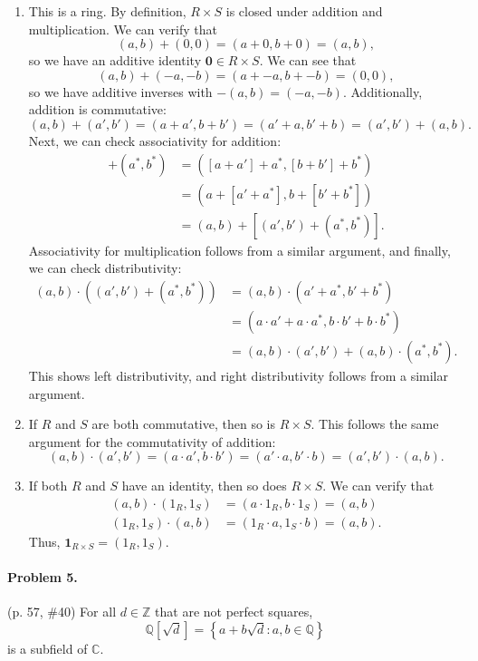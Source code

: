 \documentclass[12pt]{article}
\begin{document}
\begin{enumerate}
    \item[a.] This is a ring. By definition, $R\times S$ is closed under addition and multiplication. We can verify that \[(a, b) + (0, 0) = (a + 0, b + 0) = (a, b),\] so we have an additive identity $\mathbf 0 \in R \times S$. We can see that \[(a, b) + (-a, -b) = (a + -a, b + -b) = (0, 0),\] so we have additive inverses with $-(a, b) = (-a, -b)$. Additionally, addition is commutative: \[(a, b) + (a', b') = (a + a', b+ b') = (a' + a, b' + b) = (a', b') + (a, b).\]
    Next, we can check associativity for addition:
    \begin{align*}
        [(a,b) + (a',b')] + (a^\ast, b^\ast) &= ([a + a'] + a^\ast, [b + b'] + b^\ast) \\
        &= (a + [a' + a^\ast], b + [b' + b^\ast]) \\
        &= (a, b) + [(a', b') + (a^\ast, b^\ast)].
    \end{align*}
    Associativity for multiplication follows from a similar argument, and finally, we can check distributivity:
    \begin{align*}
        (a, b) \cdot ((a', b') + (a^\ast, b^\ast)) &= (a, b) \cdot (a' + a^\ast, b' + b^\ast) \\ &= (a \cdot a' + a \cdot a^\ast, b \cdot b' + b \cdot b^\ast) \\ &= (a, b) \cdot (a', b') + (a, b) \cdot (a^\ast, b^\ast). 
    \end{align*}
    This shows left distributivity, and right distributivity follows from a similar argument.
\item[b.] If $R$ and $S$ are both commutative, then so is $R \times S$. This follows the same argument for the commutativity of addition:
\[(a, b) \cdot (a', b') = (a \cdot a', b \cdot b') = (a' \cdot a, b' \cdot b) = (a', b') \cdot (a, b).\]
\item[c.] If both $R$ and $S$ have an identity, then so does $R \times S$. We can verify that
\begin{align*}(a, b) \cdot (1_R, 1_S) &= (a \cdot 1_R, b\cdot 1_S) = (a, b) \\
(1_R, 1_S) \cdot (a, b) &= (1_R \cdot a, 1_S \cdot b) = (a, b).\end{align*}
Thus, $\mathbf 1_{R \times S} = (1_R, 1_S)$.
\end{enumerate}

\paragraph{Problem 5.} (p. 57, \#40)
For all $d \in \mathbb Z$ that are not perfect squares, \[\mathbb Q[\sqrt{d}] = \left\{ a + b \sqrt{d} : a, b \in \mathbb Q \right\}\] is a subfield of $\mathbb C$.
\end{document}
